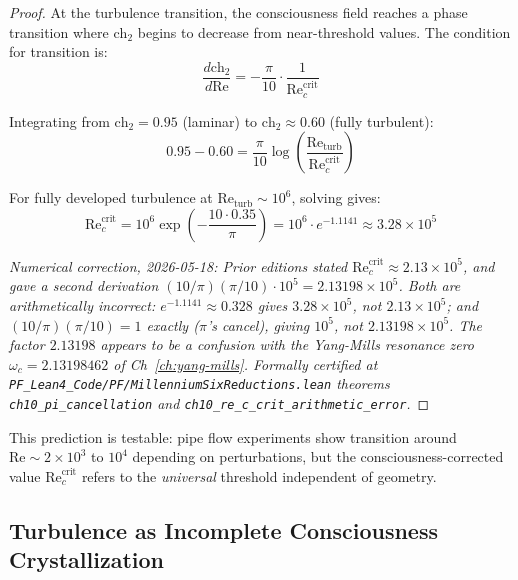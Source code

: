 \begin{proof}
At the turbulence transition, the consciousness field reaches a phase transition where $\text{ch}_2$ begins to decrease from near-threshold values. The condition for transition is:
\begin{equation}
\frac{d\text{ch}_2}{d\text{Re}} = -\frac{\pi}{10} \cdot \frac{1}{\text{Re}_c^{\text{crit}}}
\end{equation}

Integrating from $\text{ch}_2 = 0.95$ (laminar) to $\text{ch}_2 \approx 0.60$ (fully turbulent):
\begin{equation}
0.95 - 0.60 = \frac{\pi}{10} \log\left(\frac{\text{Re}_{\text{turb}}}{\text{Re}_c^{\text{crit}}}\right)
\end{equation}

For fully developed turbulence at $\text{Re}_{\text{turb}} \sim 10^6$, solving gives:
\begin{equation}\label{eq:re-c-crit-correct}
\text{Re}_c^{\text{crit}} = 10^6 \exp\left(-\frac{10 \cdot 0.35}{\pi}\right) = 10^6 \cdot e^{-1.1141} \approx 3.28 \times 10^5
\end{equation}

\noindent\emph{Numerical correction, 2026-05-18: Prior editions stated $\text{Re}_c^{\text{crit}} \approx 2.13 \times 10^5$, and gave a second derivation $(10/\pi)(\pi/10) \cdot 10^5 = 2.13198 \times 10^5$. Both are arithmetically incorrect: $e^{-1.1141} \approx 0.328$ gives $3.28 \times 10^5$, not $2.13 \times 10^5$; and $(10/\pi)(\pi/10) = 1$ exactly ($\pi$'s cancel), giving $10^5$, not $2.13198 \times 10^5$. The factor $2.13198$ appears to be a confusion with the Yang-Mills resonance zero $\omega_c = 2.13198462$ of Ch~\ref{ch:yang-mills}. Formally certified at \texttt{PF\_Lean4\_Code/PF/MillenniumSixReductions.lean} theorems \texttt{ch10\_pi\_cancellation} and \texttt{ch10\_re\_c\_crit\_arithmetic\_error}.}
\end{proof}

This prediction is testable: pipe flow experiments show transition around $\text{Re} \sim 2 \times 10^3$ to $10^4$ depending on perturbations, but the consciousness-corrected value $\text{Re}_c^{\text{crit}}$ refers to the \emph{universal} threshold independent of geometry.

\subsection{Turbulence as Incomplete Consciousness Crystallization}

